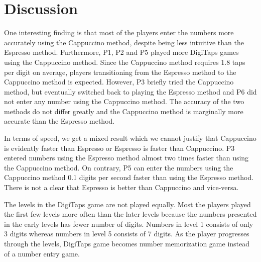 \section{Discussion}
\label{sec:discussion}

One interesting finding is that most of the players enter the numbers more accurately using the Cappuccino method, despite being less intuitive than the Espresso method. Furthermore, P1, P2 and P5 played more DigiTaps games using the Cappuccino method. Since the Cappuccino method requires 1.8 taps per digit on average, players transitioning from the Espresso method to the Cappuccino method is expected. However, P3 briefly tried the Cappuccino method, but eventually switched back to playing the Espresso method and P6 did not enter any number using the Cappuccino method. The accuracy of the two methods do not differ greatly and the Cappuccino method is marginally more accurate than the Espresso method.
\par
In terms of speed, we get a mixed result which we cannot justify that Cappuccino is evidently faster than Espresso or Espresso is faster than Cappuccino. P3 entered numbers using the Espresso method almost two times faster than using the Cappuccino method. On contrary, P5 can enter the numbers using the Cappuccino method 0.1 digits per second faster than using the Espresso method. There is not a clear that Espresso is better than Cappuccino and vice-versa. 
\par
The levels in the DigiTaps game are not played equally. Most the players played the first few levels more often than the later levels because the numbers presented in the early levels has fewer number of digits. Numbers in level 1 consists of only 3 digits whereas numbers in level 5 consists of 7 digits. As the player progresses through the levels, DigiTaps game becomes number memorization game instead of a number entry game.


\begin{comment}
Outline
  * No significant difference between Espresso and Cappuccino
  * Some players are more comfortable and reluctant to move to Cappuccino
  * Players doesn't perform as fast as we wanted due to want to correctly enter the numbers?
  
  [done]
  * Players tend to play the first couple of levels more because less digits are presented.

\end{comment}